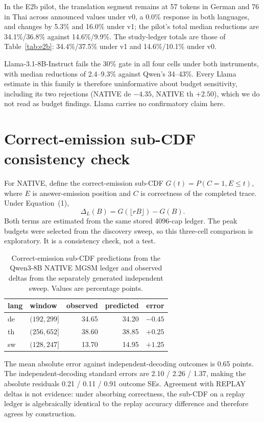 \documentclass[11pt]{article}
\begin{document}
In the E2b pilot, the translation segment remains at 57 tokens in German and
76 in Thai across announced values under v0, a 0.0\% response in both
languages, and changes by 5.3\% and 16.0\% under v1; the pilot's total median
reductions are 34.1\%/36.8\% against 14.6\%/9.9\%. The study-ledger totals are
those of Table~\ref{tab:e2b}: 34.4\%/37.5\% under v1 and 14.6\%/10.1\% under
v0.

Llama-3.1-8B-Instruct fails the 30\% gate in all four cells under both
instruments, with median reductions of 2.4--9.3\% against Qwen's 34--43\%.
Every Llama estimate in this family is therefore uninformative about budget
sensitivity, including its two rejections (NATIVE de \(-4.35\), NATIVE th
\(+2.50\)), which we do not read as budget findings. Llama carries no
confirmatory claim here.

\section{Correct-emission sub-CDF consistency check}
\label{app:subcdf}

For NATIVE, define the correct-emission sub-CDF
\(G(t)=P(C=1,E\le t)\), where \(E\) is answer-emission position and \(C\) is
correctness of the completed trace. Under Equation~(1),
\[
\Delta_L(B)=G(\lfloor rB\rfloor)-G(B).
\]
Both terms are estimated from the same stored 4096-cap ledger. The peak
budgets were selected from the discovery sweep, so this three-cell comparison
is exploratory. It is a consistency check, not a test.

\begin{table}[t]
\centering
\small
\caption{Correct-emission sub-CDF predictions from the Qwen3-8B NATIVE MGSM
ledger and observed deltas from the separately generated independent sweep.
Values are percentage points.}
\label{tab:subcdf}
\begin{tabular}{llrrr}
\toprule
lang & window & observed & predicted & error \\
\midrule
de & \((192,299]\) & 34.65 & 34.20 & \(-0.45\) \\
th & \((256,652]\) & 38.60 & 38.85 & \(+0.25\) \\
sw & \((128,247]\) & 13.70 & 14.95 & \(+1.25\) \\
\bottomrule
\end{tabular}
\end{table}

The mean absolute error against independent-decoding outcomes is 0.65 points. The independent-decoding standard errors are 2.10 / 2.26 / 1.37, making
the absolute residuals 0.21 / 0.11 / 0.91 outcome SEs. Agreement with REPLAY
deltas is not evidence: under absorbing correctness, the sub-CDF on a replay
ledger is algebraically identical to the replay accuracy difference and
therefore agrees by construction.
\end{document}
